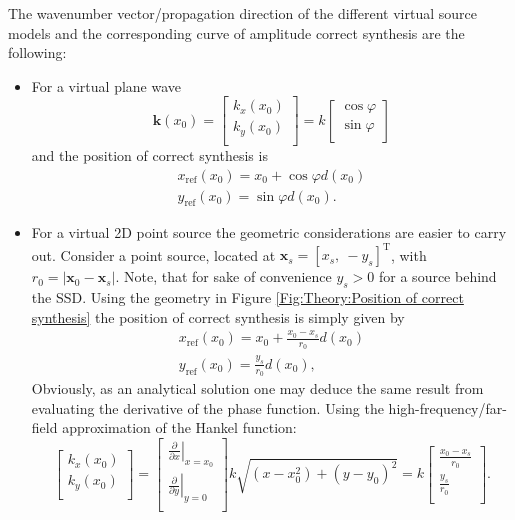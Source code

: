 \documentclass[12pt,a4paper]{article}
\newcommand{\sinfi}{\sin\varphi}
\newcommand{\cosfi}{\cos\varphi}
\newcommand{\vxo}{\mathbf{x}_0}
\begin{document}
The wavenumber vector/propagation direction of the different virtual source models and the corresponding curve of amplitude correct synthesis are the following:
\begin{itemize}
\item For a virtual plane wave 
\begin{equation}
\mathbf{k}(x_0) = \begin{bmatrix} k_x(x_0) \\[0.3em] k_y(x_0)\\[0.3em]    \end{bmatrix} =  k\begin{bmatrix} \cosfi \\[0.3em] \sinfi \\[0.3em]    \end{bmatrix}
\end{equation}
and the position of correct synthesis is 
\begin{eqnarray}
x_{\mathrm{ref}}(x_0) = x_0 + \cosfi d(x_0) \\
y_{\mathrm{ref}}(x_0) = \sinfi d(x_0).
\end{eqnarray}
\item For a virtual 2D point source the geometric considerations are easier to carry out. Consider a point source, located at $\mathbf{x}_s = [ x_s,\ -y_s ]^{\mathrm{T}}$, with $r_0 = | \vxo - \mathbf{x}_s |$. Note, that for sake of convenience $y_s>0$ for a source behind the SSD. Using the geometry in Figure \ref{Fig:Theory:Position of correct synthesis} the position of correct synthesis is simply given by
\begin{eqnarray}
x_{\mathrm{ref}}(x_0) = x_0 + \frac{x_0-x_s}{r_0} d(x_0) \\
y_{\mathrm{ref}}(x_0) = \frac{y_s}{r_0} d(x_0),
\label{Eq:Line_source_correcty_synth}
\end{eqnarray}
Obviously, as an analytical solution one may deduce the same result from evaluating the derivative of the phase function. Using the high-frequency/far-field approximation of the Hankel function:
\begin{equation} 
\begin{bmatrix} k_x(x_0) \\[0.3em] k_y(x_0)\\[0.3em]    \end{bmatrix} = 
\begin{bmatrix} 
\left. \frac{\partial}{\partial x} \right|_{x = x_0} 
\\[0.3em] 
\left. \frac{\partial}{\partial y} \right|_{y = 0} 
\\[0.3em]    \end{bmatrix} 
k\sqrt{(x-x_0^2) + (y-y_0)^2} = 
k\begin{bmatrix} 
\frac{x_0- x_s}{r_0}
\\[0.3em] 
\frac{y_s}{r_0}
\\[0.3em]    \end{bmatrix} 
.
\end{equation}
\end{itemize}
\end{document}
